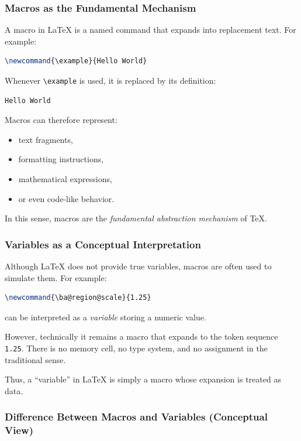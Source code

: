 \subsubsection{Macros as the Fundamental Mechanism}

A macro in \LaTeX{} is a named command that expands into replacement text. For example:

\begin{lstlisting}[language=LaTeX]
\newcommand{\example}{Hello World}
\end{lstlisting}
Whenever \lstinline|\example| is used, it is replaced by its definition:

\begin{lstlisting}[language=LaTeX]
Hello World
\end{lstlisting}
Macros can therefore represent:

\begin{itemize}
\item text fragments,
\item formatting instructions,
\item mathematical expressions,
\item or even code-like behavior.
\end{itemize}
In this sense, macros are the \emph{fundamental abstraction mechanism} of \TeX{}.

\subsubsection{Variables as a Conceptual Interpretation}

Although \LaTeX{} does not provide true variables, macros are often used to simulate them. For example:
\begin{lstlisting}[language=LaTeX]
\newcommand{\ba@region@scale}{1.25}
\end{lstlisting}
can be interpreted as a \emph{variable} storing a numeric value.

However, technically it remains a macro that expands to the token sequence \lstinline|1.25|. There is no memory cell, no type system, and no assignment in the traditional sense.

Thus, a ``variable'' in \LaTeX{} is simply a macro whose expansion is treated as data.

\subsubsection{Difference Between Macros and Variables (Conceptual View)}

